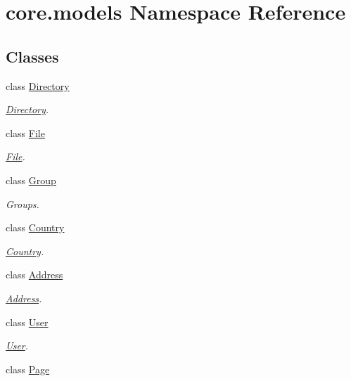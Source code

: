 \hypertarget{namespacecore_1_1models}{\section{core.\-models Namespace Reference}
\label{namespacecore_1_1models}
}
\subsection*{Classes}
\begin{DoxyCompactItemize}
\item 
class \hyperlink{classcore_1_1models_1_1Directory}{Directory}
\begin{DoxyCompactList}\small\item\em \hyperlink{classcore_1_1models_1_1Directory}{Directory}. \end{DoxyCompactList}\item 
class \hyperlink{classcore_1_1models_1_1File}{File}
\begin{DoxyCompactList}\small\item\em \hyperlink{classcore_1_1models_1_1File}{File}. \end{DoxyCompactList}\item 
class \hyperlink{classcore_1_1models_1_1Group}{Group}
\begin{DoxyCompactList}\small\item\em Groups. \end{DoxyCompactList}\item 
class \hyperlink{classcore_1_1models_1_1Country}{Country}
\begin{DoxyCompactList}\small\item\em \hyperlink{classcore_1_1models_1_1Country}{Country}. \end{DoxyCompactList}\item 
class \hyperlink{classcore_1_1models_1_1Address}{Address}
\begin{DoxyCompactList}\small\item\em \hyperlink{classcore_1_1models_1_1Address}{Address}. \end{DoxyCompactList}\item 
class \hyperlink{classcore_1_1models_1_1User}{User}
\begin{DoxyCompactList}\small\item\em \hyperlink{classcore_1_1models_1_1User}{User}. \end{DoxyCompactList}\item 
class \hyperlink{classcore_1_1models_1_1Page}{Page}

\end{DoxyCompactItemize}
